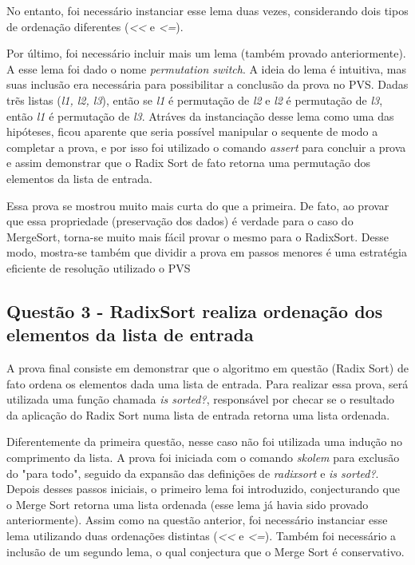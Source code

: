 \documentclass[12pt]{article}
\begin{document}
No entanto, foi necessário instanciar esse lema duas vezes, considerando dois tipos de ordenação diferentes (\textit{<<} e \textit{<=}).

Por último, foi necessário incluir mais um lema (também provado anteriormente). A esse lema foi dado o nome \textit{permutation switch}. A ideia do lema é intuitiva, mas suas inclusão era necessária para possibilitar a conclusão da prova no PVS. Dadas trẽs listas (\textit{l1, l2, l3}), então se \textit{l1} é permutação de \textit{l2} e \textit{l2} é permutação de \textit{l3}, então \textit{l1} é permutação de \textit{l3}. Atráves da instanciação desse lema como uma das hipóteses, ficou aparente que seria possível manipular o sequente de modo a completar a prova, e por isso foi utilizado o comando \textit{assert} para concluir a prova e assim demonstrar que o Radix Sort de fato retorna uma permutação dos elementos da lista de entrada.

Essa prova se mostrou muito mais curta do que a primeira. De fato, ao provar que essa propriedade (preservação dos dados) é verdade para o caso do MergeSort, torna-se muito mais fácil provar o mesmo para o RadixSort. Desse modo, mostra-se também que dividir a prova em passos menores é uma estratégia eficiente de resolução utilizado o PVS

\subsection{Questão 3 - RadixSort realiza ordenação dos elementos da lista de entrada}
A prova final consiste em demonstrar que o algoritmo em questão (Radix Sort) de fato ordena os elementos dada uma lista de entrada. Para realizar essa prova, será utilizada uma função chamada \textit{is sorted?}, responsável por checar se o resultado da aplicação do Radix Sort numa lista de entrada retorna uma lista ordenada.

Diferentemente da primeira questão, nesse caso não foi utilizada uma indução no comprimento da lista. A prova foi iniciada com o comando \textit{skolem} para exclusão do "para todo", seguido da expansão das definições de \textit{radixsort} e \textit{is sorted?}. Depois desses passos iniciais, o primeiro lema foi introduzido, conjecturando que o Merge Sort retorna uma lista ordenada (esse lema já havia sido provado anteriormente). Assim como na questão anterior, foi necessário instanciar esse lema utilizando duas ordenações distintas (\textit{<<} e \textit{<=}). Também foi necessário a inclusão de um segundo lema, o qual conjectura que o Merge Sort é conservativo.
\end{document}
